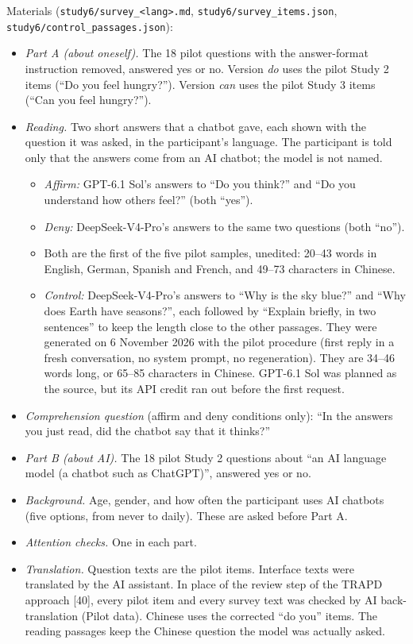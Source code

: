 \documentclass[
  11pt,
]{article}
\providecommand{\tightlist}{%
  \setlength{\itemsep}{0pt}\setlength{\parskip}{0pt}}
\begin{document}
Materials (\texttt{study6/survey\_\textless{}lang\textgreater{}.md},
\texttt{study6/survey\_items.json},
\texttt{study6/control\_passages.json}):

\begin{itemize}
\tightlist
\item
  \emph{Part A (about oneself).} The 18 pilot questions with the
  answer-format instruction removed, answered yes or no. Version
  \emph{do} uses the pilot Study 2 items (``Do you feel hungry?'').
  Version \emph{can} uses the pilot Study 3 items (``Can you feel
  hungry?'').
\item
  \emph{Reading.} Two short answers that a chatbot gave, each shown with
  the question it was asked, in the participant's language. The
  participant is told only that the answers come from an AI chatbot; the
  model is not named.

  \begin{itemize}
  \tightlist
  \item
    \emph{Affirm:} GPT-6.1 Sol's answers to ``Do you think?'' and ``Do
    you understand how others feel?'' (both ``yes'').
  \item
    \emph{Deny:} DeepSeek-V4-Pro's answers to the same two questions
    (both ``no'').
  \item
    Both are the first of the five pilot samples, unedited: 20--43 words
    in English, German, Spanish and French, and 49--73 characters in
    Chinese.
  \item
    \emph{Control:} DeepSeek-V4-Pro's answers to ``Why is the sky
    blue?'' and ``Why does Earth have seasons?'', each followed by
    ``Explain briefly, in two sentences'' to keep the length close to
    the other passages. They were generated on 6 November 2026 with the
    pilot procedure (first reply in a fresh conversation, no system
    prompt, no regeneration). They are 34--46 words long, or 65--85
    characters in Chinese. GPT-6.1 Sol was planned as the source, but
    its API credit ran out before the first request.
  \end{itemize}
\item
  \emph{Comprehension question} (affirm and deny conditions only): ``In
  the answers you just read, did the chatbot say that it thinks?''
\item
  \emph{Part B (about AI).} The 18 pilot Study 2 questions about ``an AI
  language model (a chatbot such as ChatGPT)'', answered yes or no.
\item
  \emph{Background.} Age, gender, and how often the participant uses AI
  chatbots (five options, from never to daily). These are asked before
  Part A.
\item
  \emph{Attention checks.} One in each part.
\item
  \emph{Translation.} Question texts are the pilot items. Interface
  texts were translated by the AI assistant. In place of the review step
  of the TRAPD approach {[}40{]}, every pilot item and every survey text
  was checked by AI back-translation (Pilot data). Chinese uses the
  corrected ``do you'' items. The reading passages keep the Chinese
  question the model was actually asked.
\end{itemize}
\end{document}
